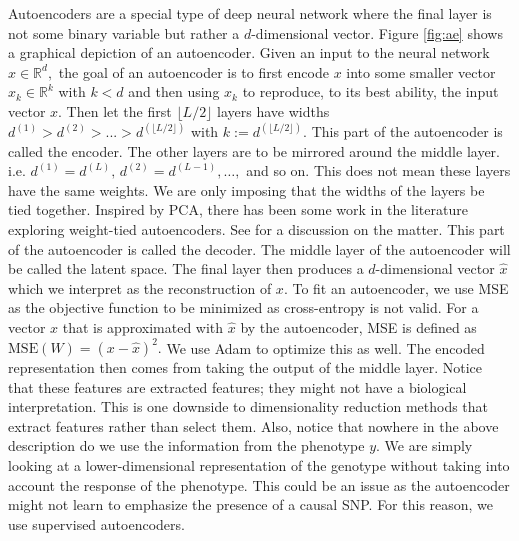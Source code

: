 \documentclass{article}
\begin{document}
Autoencoders are a special type of deep neural network where the final layer is not some binary variable but rather a $d$-dimensional vector. Figure \ref{fig:ae} shows a graphical depiction of an autoencoder. Given an input to the neural network $x \in \mathbb{R}^d,$ the goal of an autoencoder is to first encode $x$ into some smaller vector $x_k \in \mathbb{R}^k$ with $k < d$ and then using $x_k$ to reproduce, to its best ability, the input vector $x$. Then let the first $\lfloor L/2 \rfloor$ layers have widths $d^{(1)} > d^{(2)} >...> d^{(\lfloor L/2 \rfloor)}$ with $k := d^{(\lfloor L/2 \rfloor)}.$ This part of the autoencoder is called the encoder. The other layers are to be mirrored around the middle layer. i.e. $d^{(1)} = d^{(L)}, \, d^{(2)} = d^{(L-1)},\dots,$ and so on. This does not mean these layers have the same weights. We are only imposing that the widths of the layers be tied together. Inspired by PCA, there has been some work in the literature exploring weight-tied autoencoders. See \cite{tied} for a discussion on the matter. This part of the autoencoder is called the decoder. The middle layer of the autoencoder will be called the latent space. The final layer then produces a $d$-dimensional vector $\hat{x}$ which we interpret as the reconstruction of $x.$ To fit an autoencoder, we use MSE as the objective function to be minimized as cross-entropy is not valid. For a vector $x$ that is approximated with $\hat{x}$ by the autoencoder, MSE is defined as $\mathrm{MSE}(W) = (x-\hat{x})^2.$ We use Adam \cite{adam} to optimize this as well. The encoded representation then comes from taking the output of the middle layer. Notice that these features are extracted features; they might not have a biological interpretation. This is one downside to dimensionality reduction methods that extract features rather than select them. Also, notice that nowhere in the above description do we use the information from the phenotype $y.$ We are simply looking at a lower-dimensional representation of the genotype without taking into account the response of the phenotype. This could be an issue as the autoencoder might not learn to emphasize the presence of a causal SNP. For this reason, we use supervised autoencoders.
\end{document}
